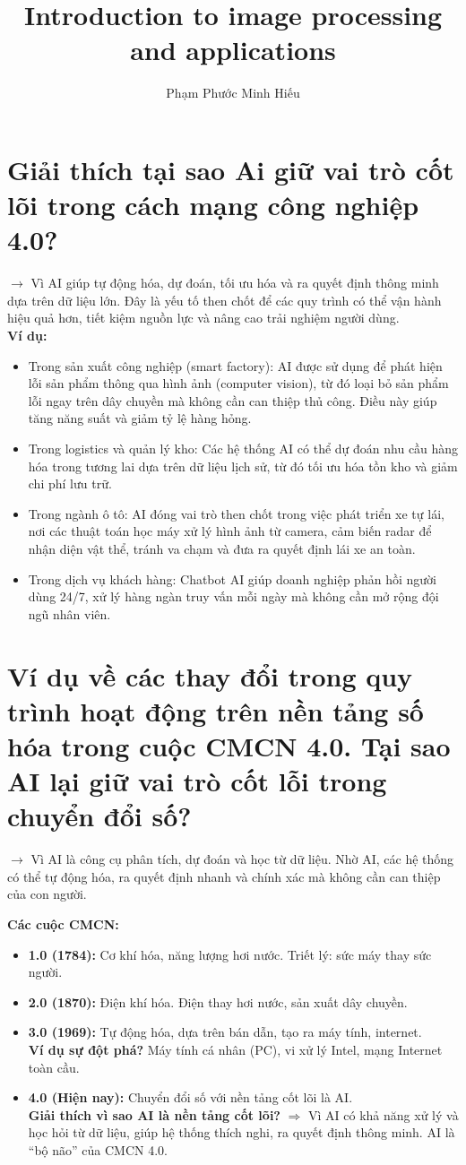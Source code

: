 \documentclass[12pt]{article}
\title{Introduction to image processing and applications}
\author{Phạm Phước Minh Hiếu}
\begin{document}
	\section{Giải thích tại sao Ai giữ vai trò cốt lõi trong cách mạng công nghiệp 4.0?}
	
	$\rightarrow$ Vì AI giúp tự động hóa, dự đoán, tối ưu hóa và ra quyết định thông minh dựa trên dữ liệu lớn. Đây là yếu tố then chốt để các quy trình có thể vận hành hiệu quả hơn, tiết kiệm nguồn lực và nâng cao trải nghiệm người dùng.\\
	\textbf{Ví dụ:}
	\begin{itemize}
		\item Trong sản xuất công nghiệp (smart factory): AI được sử dụng để phát hiện lỗi sản phẩm thông qua hình ảnh (computer vision), từ đó loại bỏ sản phẩm lỗi ngay trên dây chuyền mà không cần can thiệp thủ công. Điều này giúp tăng năng suất và giảm tỷ lệ hàng hỏng.
		\item Trong logistics và quản lý kho: Các hệ thống AI có thể dự đoán nhu cầu hàng hóa trong tương lai dựa trên dữ liệu lịch sử, từ đó tối ưu hóa tồn kho và giảm chi phí lưu trữ.
		\item Trong ngành ô tô: AI đóng vai trò then chốt trong việc phát triển xe tự lái, nơi các thuật toán học máy xử lý hình ảnh từ camera, cảm biến radar để nhận diện vật thể, tránh va chạm và đưa ra quyết định lái xe an toàn.
		\item Trong dịch vụ khách hàng: Chatbot AI giúp doanh nghiệp phản hồi người dùng 24/7, xử lý hàng ngàn truy vấn mỗi ngày mà không cần mở rộng đội ngũ nhân viên.
	\end{itemize}
	
	\section{Ví dụ về các thay đổi trong quy trình hoạt động trên nền tảng số hóa trong cuộc CMCN 4.0. Tại sao AI lại giữ vai trò cốt lỗi trong chuyển đổi số?}
	
	$\rightarrow$ Vì AI là công cụ phân tích, dự đoán và học từ dữ liệu. Nhờ AI, các hệ thống có thể tự động hóa, ra quyết định nhanh và chính xác mà không cần can thiệp của con người.
	
	\textbf{Các cuộc CMCN:}
	\begin{itemize}
	\item \textbf{1.0 (1784):} Cơ khí hóa, năng lượng hơi nước. Triết lý: sức máy thay sức người.
	\item \textbf{2.0 (1870):} Điện khí hóa. Điện thay hơi nước, sản xuất dây chuyền.
	\item \textbf{3.0 (1969):} Tự động hóa, dựa trên bán dẫn, tạo ra máy tính, internet.\\
	\textbf{Ví dụ sự đột phá?} Máy tính cá nhân (PC), vi xử lý Intel, mạng Internet toàn cầu.
	\item \textbf{4.0 (Hiện nay):} Chuyển đổi số với nền tảng cốt lõi là AI.\\
	\textbf{Giải thích vì sao AI là nền tảng cốt lõi?} $\Rightarrow$ Vì AI có khả năng xử lý và học hỏi từ dữ liệu, giúp hệ thống thích nghi, ra quyết định thông minh. AI là “bộ não” của CMCN 4.0.
	\end{itemize}
	
\end{document}
